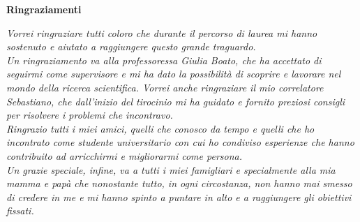 \thispagestyle{empty}
\begin{center}
  {\bf \Huge Ringraziamenti}
\end{center}
\vspace{4cm}
\emph{Vorrei ringraziare tutti coloro che durante il percorso di laurea mi hanno sostenuto e aiutato a raggiungere questo grande traguardo.\\
Un ringraziamento va alla professoressa Giulia Boato, che ha accettato di seguirmi come supervisore e mi ha dato la possibilità di scoprire e lavorare nel mondo della ricerca scientifica. Vorrei anche ringraziare il mio correlatore Sebastiano, che dall'inizio del tirocinio mi ha guidato e fornito preziosi consigli per risolvere i problemi che incontravo.\\
Ringrazio tutti i miei amici, quelli che conosco da tempo e quelli che ho incontrato come studente universitario con cui ho condiviso esperienze che hanno contribuito ad arricchirmi e migliorarmi come persona.\\
Un grazie speciale, infine, va a tutti i miei famigliari e specialmente alla mia mamma e papà che nonostante tutto, in ogni circostanza, non hanno mai smesso di credere in me e mi hanno spinto a puntare in alto e a raggiungere gli obiettivi fissati.}
